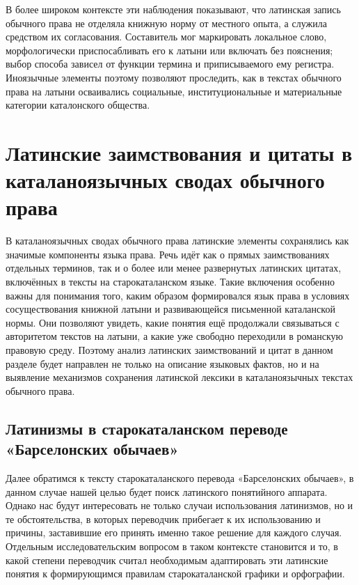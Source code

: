 В более широком контексте эти наблюдения показывают, что латинская запись обычного права не отделяла книжную норму от местного опыта, а служила средством их согласования. Составитель мог маркировать локальное слово, морфологически приспосабливать его к латыни или включать без пояснения; выбор способа зависел от функции термина и приписываемого ему регистра. Иноязычные элементы поэтому позволяют проследить, как в текстах обычного права на латыни осваивались социальные, институциональные и материальные категории каталонского общества.

\section{Латинские заимствования и цитаты в каталаноязычных сводах обычного права}

В каталаноязычных сводах обычного права латинские элементы сохранялись как значимые компоненты языка права. Речь идёт как о прямых заимствованиях отдельных терминов, так и о более или менее развернутых латинских цитатах, включённых в тексты на старокаталанском языке. Такие включения особенно важны для понимания того, каким образом формировался язык права в условиях сосуществования книжной латыни и развивающейся письменной каталанской нормы. Они позволяют увидеть, какие понятия ещё продолжали связываться с авторитетом текстов на латыни, а какие уже свободно переходили в романскую правовую среду. Поэтому анализ латинских заимствований и цитат в данном разделе будет направлен не только на описание языковых фактов, но и на выявление механизмов сохранения латинской лексики в каталаноязычных текстах обычного права.

\subsection{Латинизмы в старокаталанском переводе «Барселонских обычаев»}

Далее обратимся к тексту старокаталанского перевода «Барселонских обычаев», в данном случае нашей целью будет поиск латинского понятийного аппарата. Однако нас будут интересовать не только случаи использования латинизмов, но и те обстоятельства, в которых переводчик прибегает к их использованию и причины, заставившие его принять именно такое решение для каждого случая. Отдельным исследовательским вопросом в таком контексте становится и то, в какой степени переводчик считал необходимым адаптировать эти латинские понятия к формирующимся правилам старокаталанской графики и орфографии.

